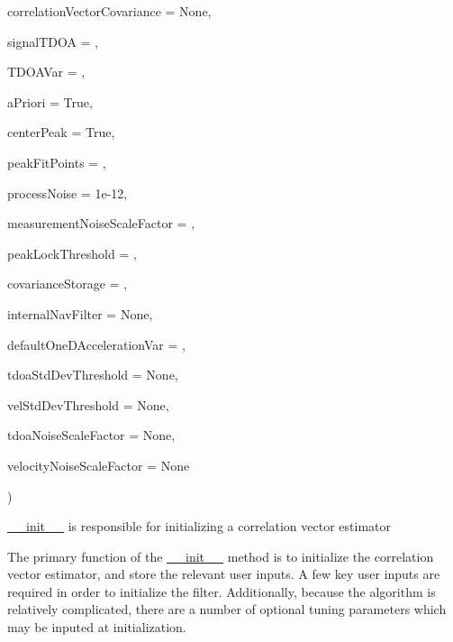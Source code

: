 {\begin{DoxyParamCaption}
\item[{}]{correlation\+Vector\+Covariance = {\ttfamily None}, }
\item[{}]{signal\+T\+D\+OA = {}, }
\item[{}]{T\+D\+O\+A\+Var = {}, }
\item[{}]{a\+Priori = {\ttfamily True}, }
\item[{}]{center\+Peak = {\ttfamily True}, }
\item[{}]{peak\+Fit\+Points = {}, }
\item[{}]{process\+Noise = {\ttfamily 1e-\/12}, }
\item[{}]{measurement\+Noise\+Scale\+Factor = {}, }
\item[{}]{peak\+Lock\+Threshold = {}, }
\item[{}]{covariance\+Storage = {\ttfamily {}\textquotesingle{}}, }
\item[{}]{internal\+Nav\+Filter = {\ttfamily None}, }
\item[{}]{default\+One\+D\+Acceleration\+Var = {}, }
\item[{}]{tdoa\+Std\+Dev\+Threshold = {\ttfamily None}, }
\item[{}]{vel\+Std\+Dev\+Threshold = {\ttfamily None}, }
\item[{}]{tdoa\+Noise\+Scale\+Factor = {\ttfamily None}, }
\item[{}]{velocity\+Noise\+Scale\+Factor = {\ttfamily None}}
\end{DoxyParamCaption}
)}\hypertarget{classmodest_1_1substates_1_1correlationvector_1_1CorrelationVector_a094103eb6a6bf7bbc118f86f03e1c885}{}\label{classmodest_1_1substates_1_1correlationvector_1_1CorrelationVector_a094103eb6a6bf7bbc118f86f03e1c885}


\hyperlink{classmodest_1_1substates_1_1correlationvector_1_1CorrelationVector_a094103eb6a6bf7bbc118f86f03e1c885}{\+\_\+\+\_\+init\+\_\+\+\_\+} is responsible for initializing a correlation vector estimator 

The primary function of the \hyperlink{classmodest_1_1substates_1_1correlationvector_1_1CorrelationVector_a094103eb6a6bf7bbc118f86f03e1c885}{\+\_\+\+\_\+init\+\_\+\+\_\+} method is to initialize the correlation vector estimator, and store the relevant user inputs. A few key user inputs are required in order to initialize the filter. Additionally, because the algorithm is relatively complicated, there are a number of optional tuning parameters which may be inputed at initialization.

